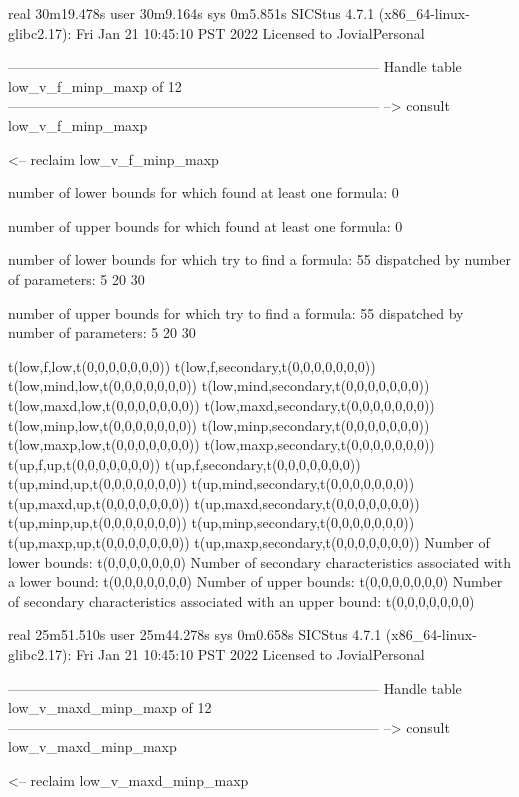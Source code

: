 real	30m19.478s
user	30m9.164s
sys	0m5.851s
SICStus 4.7.1 (x86_64-linux-glibc2.17): Fri Jan 21 10:45:10 PST 2022
Licensed to JovialPersonal


--------------------------------------------------------------------------------
Handle table low_v_f_minp_maxp of 12
--------------------------------------------------------------------------------
--> consult low_v_f_minp_maxp

<-- reclaim low_v_f_minp_maxp

number of lower bounds for which found at least one formula: 0

number of upper bounds for which found at least one formula: 0

number of lower bounds for which try to find a formula: 55
dispatched by number of parameters: 5  20  30

number of upper bounds for which try to find a formula: 55
dispatched by number of parameters: 5  20  30

t(low,f,low,t(0,0,0,0,0,0,0))
t(low,f,secondary,t(0,0,0,0,0,0,0))
t(low,mind,low,t(0,0,0,0,0,0,0))
t(low,mind,secondary,t(0,0,0,0,0,0,0))
t(low,maxd,low,t(0,0,0,0,0,0,0))
t(low,maxd,secondary,t(0,0,0,0,0,0,0))
t(low,minp,low,t(0,0,0,0,0,0,0))
t(low,minp,secondary,t(0,0,0,0,0,0,0))
t(low,maxp,low,t(0,0,0,0,0,0,0))
t(low,maxp,secondary,t(0,0,0,0,0,0,0))
t(up,f,up,t(0,0,0,0,0,0,0))
t(up,f,secondary,t(0,0,0,0,0,0,0))
t(up,mind,up,t(0,0,0,0,0,0,0))
t(up,mind,secondary,t(0,0,0,0,0,0,0))
t(up,maxd,up,t(0,0,0,0,0,0,0))
t(up,maxd,secondary,t(0,0,0,0,0,0,0))
t(up,minp,up,t(0,0,0,0,0,0,0))
t(up,minp,secondary,t(0,0,0,0,0,0,0))
t(up,maxp,up,t(0,0,0,0,0,0,0))
t(up,maxp,secondary,t(0,0,0,0,0,0,0))
Number of lower bounds:                                             t(0,0,0,0,0,0,0)
Number of secondary characteristics associated with a lower bound:  t(0,0,0,0,0,0,0)
Number of upper bounds:                                             t(0,0,0,0,0,0,0)
Number of secondary characteristics associated with an upper bound: t(0,0,0,0,0,0,0)

real	25m51.510s
user	25m44.278s
sys	0m0.658s
SICStus 4.7.1 (x86_64-linux-glibc2.17): Fri Jan 21 10:45:10 PST 2022
Licensed to JovialPersonal


--------------------------------------------------------------------------------
Handle table low_v_maxd_minp_maxp of 12
--------------------------------------------------------------------------------
--> consult low_v_maxd_minp_maxp

<-- reclaim low_v_maxd_minp_maxp

